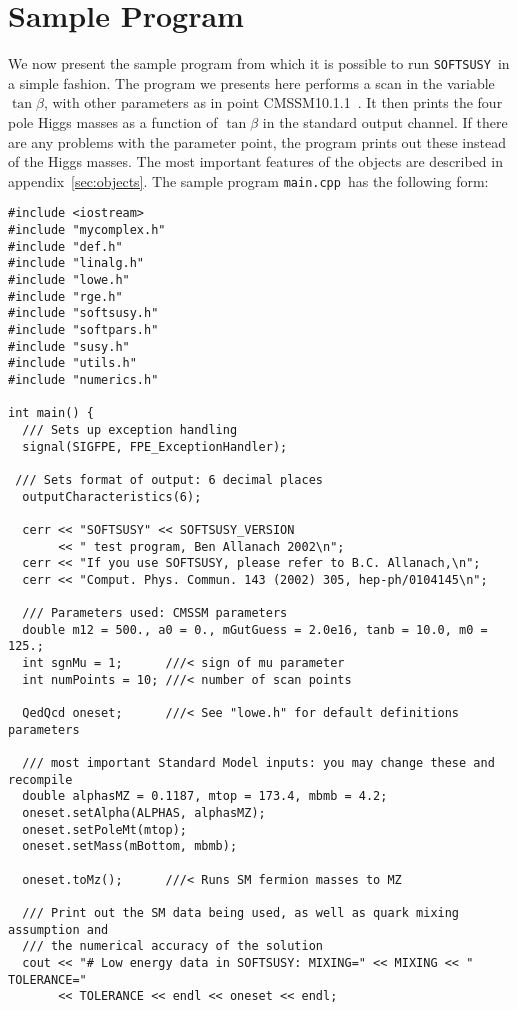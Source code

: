 \documentclass[]{article}
\def\SOFTSUSY{{\tt SOFTSUSY}}
\def\code#1{\small{\tt #1}\normalsize}
\begin{document}
\section{Sample Program \label{sec:prog}}
We now present the sample program from which it is possible to run
\SOFTSUSY~in a simple fashion. The program we presents here performs a scan in
the variable $\tan \beta$, with other parameters as in point
CMSSM10.1.1~\cite{bench}. 
It then prints the four pole Higgs masses as a function of $\tan \beta$ in the
standard output channel. If there are any problems with the parameter point,
the program prints out these instead of the Higgs masses.
The most important features of the objects are 
described in appendix~\ref{sec:objects}.
The sample program \code{main.cpp}~has the following form: 
\small
\begin{verbatim}
#include <iostream>
#include "mycomplex.h"
#include "def.h"
#include "linalg.h"
#include "lowe.h"
#include "rge.h"
#include "softsusy.h"
#include "softpars.h"
#include "susy.h"
#include "utils.h"
#include "numerics.h"

int main() {
  /// Sets up exception handling
  signal(SIGFPE, FPE_ExceptionHandler); 

 /// Sets format of output: 6 decimal places
  outputCharacteristics(6);

  cerr << "SOFTSUSY" << SOFTSUSY_VERSION 
       << " test program, Ben Allanach 2002\n";
  cerr << "If you use SOFTSUSY, please refer to B.C. Allanach,\n";
  cerr << "Comput. Phys. Commun. 143 (2002) 305, hep-ph/0104145\n";

  /// Parameters used: CMSSM parameters
  double m12 = 500., a0 = 0., mGutGuess = 2.0e16, tanb = 10.0, m0 = 125.;
  int sgnMu = 1;      ///< sign of mu parameter 
  int numPoints = 10; ///< number of scan points

  QedQcd oneset;      ///< See "lowe.h" for default definitions parameters

  /// most important Standard Model inputs: you may change these and recompile
  double alphasMZ = 0.1187, mtop = 173.4, mbmb = 4.2;
  oneset.setAlpha(ALPHAS, alphasMZ);
  oneset.setPoleMt(mtop);
  oneset.setMass(mBottom, mbmb);

  oneset.toMz();      ///< Runs SM fermion masses to MZ

  /// Print out the SM data being used, as well as quark mixing assumption and
  /// the numerical accuracy of the solution
  cout << "# Low energy data in SOFTSUSY: MIXING=" << MIXING << " TOLERANCE=" 
       << TOLERANCE << endl << oneset << endl;


\end{verbatim}
\end{document}
